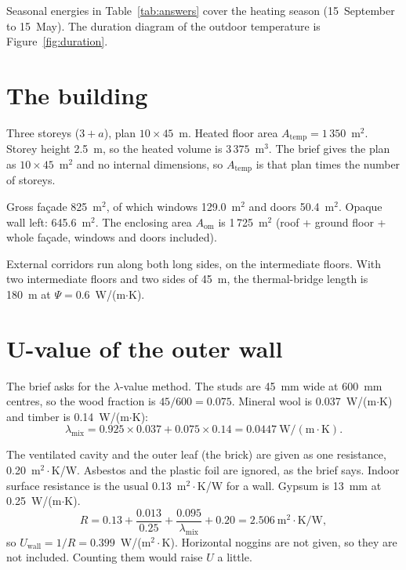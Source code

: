 \documentclass[11pt,a4paper]{article}
\newcommand{\WmK}{W/(m$\cdot$K)}
\newcommand{\WmTwoK}{W/(m$^{2}{\cdot}$K)}
\begin{document}
Seasonal energies in Table~\ref{tab:answers} cover the heating season
(15~September to 15~May). The duration diagram of the outdoor temperature
is Figure~\ref{fig:duration}.

\section{The building}

Three storeys ($3 + a$), plan $10 \times 45$~m.
Heated floor area $A_{\mathrm{temp}} = 1\,350$~m$^{2}$.
Storey height 2.5~m, so the heated volume is $3\,375$~m$^{3}$.
The brief gives the plan as $10 \times 45$~m$^{2}$ and no internal
dimensions, so $A_{\mathrm{temp}}$ is that plan times the number of storeys.

Gross fa\c{c}ade 825~m$^{2}$, of which windows 129.0~m$^{2}$
and doors 50.4~m$^{2}$. Opaque wall left: 645.6~m$^{2}$.
The enclosing area $A_{\mathrm{om}}$ is 1\,725~m$^{2}$
(roof + ground floor + whole fa\c{c}ade, windows and doors included).

External corridors run along both long sides, on the intermediate floors.
With two intermediate floors and two sides of 45~m, the thermal-bridge
length is 180~m at $\Psi = 0.6$~\WmK.

\section{U-value of the outer wall}
\label{sec:wall}

The brief asks for the $\lambda$-value method. The studs are 45~mm wide
at 600~mm centres, so the wood fraction is $45/600 = 0.075$.
Mineral wool is 0.037~\WmK{} and timber is 0.14~\WmK:
\begin{equation}
  \lambda_{\mathrm{mix}}
  = 0.925 \times 0.037 + 0.075 \times 0.14
  = 0.0447~\mathrm{W/(m{\cdot}K)}.
  \label{eq:lambda}
\end{equation}

The ventilated cavity and the outer leaf (the brick) are given as one
resistance, 0.20~m$^{2}{\cdot}$K/W. Asbestos and the plastic foil are
ignored, as the brief says. Indoor surface resistance is the usual
0.13~m$^{2}{\cdot}$K/W for a wall. Gypsum is 13~mm at 0.25~\WmK.
\begin{equation}
  R = 0.13 + \frac{0.013}{0.25} + \frac{0.095}{\lambda_{\mathrm{mix}}} + 0.20
    = 2.506~\mathrm{m^{2}{\cdot}K/W},
  \label{eq:rwall}
\end{equation}
so $U_{\mathrm{wall}} = 1/R = 0.399$~\WmTwoK.
Horizontal noggins are not given, so they are not included.
Counting them would raise $U$ a little.
\end{document}

